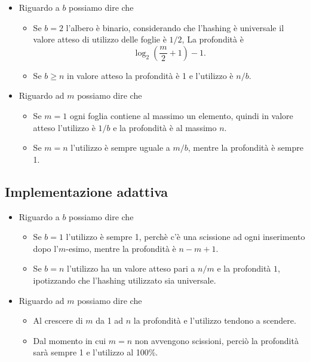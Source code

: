 \documentclass[a4paper]{article}
\begin{document}
\begin{itemize}
	\item Riguardo a $b$ possiamo dire che
	\begin{itemize}
		\item Se $b = 2$ l'albero è binario, considerando che l'hashing è universale il valore atteso di utilizzo delle foglie è $1/2$, La profondità è
			$$ \log_2 \left( \frac{m}{2} + 1 \right) - 1. $$
		\item Se $b \geq n$ in valore atteso la profondità è 1 e l'utilizzo è $n / b$.
	\end{itemize}
	\item Riguardo ad $m$ possiamo dire che
	\begin{itemize}
		\item Se $m = 1$ ogni foglia contiene al massimo un elemento, quindi in valore atteso l'utilizzo è $1 / b$ e la profondità è al massimo $n$.
		\item Se $m = n$ l'utilizzo è sempre uguale a $m / b$, mentre la profondità è sempre 1.
	\end{itemize}
\end{itemize}

\subsection{Implementazione adattiva}

\begin{itemize}
	\item Riguardo a $b$ possiamo dire che
	\begin{itemize}
		\item Se $b = 1$ l'utilizzo è sempre 1, perchè c'è una scissione ad ogni inserimento dopo l'$m$-esimo, mentre la profondità è $n - m + 1$.
		\item Se $b = n$ l'utilizzo ha un valore atteso pari a $n/m$ e la profondità $1$, ipotizzando che l'hashing utilizzato sia universale.
	\end{itemize}
	\item Riguardo ad $m$ possiamo dire che
	\begin{itemize}
		\item Al crescere di $m$ da 1 ad $n$ la profondità e l'utilizzo tendono a scendere. 
		\item Dal momento in cui $m = n$ non avvengono scissioni, perciò la profondità sarà sempre 1 e l'utilizzo al 100\%.
	\end{itemize}
\end{itemize}
\end{document}
